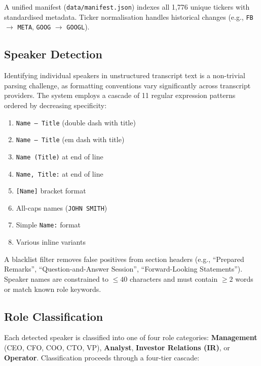 \documentclass[12pt,a4paper]{article}
\begin{document}
A unified manifest (\texttt{data/manifest.json}) indexes all 1,776 unique tickers with standardised metadata. Ticker normalisation handles historical changes (e.g., \texttt{FB} $\to$ \texttt{META}, \texttt{GOOG} $\to$ \texttt{GOOGL}).

\subsection{Speaker Detection}
\label{sec:speaker-detection}

Identifying individual speakers in unstructured transcript text is a non-trivial parsing challenge, as formatting conventions vary significantly across transcript providers. The system employs a cascade of 11 regular expression patterns ordered by decreasing specificity:

\begin{enumerate}[noitemsep]
    \item \texttt{Name -- Title} (double dash with title)
    \item \texttt{Name --- Title} (em dash with title)
    \item \texttt{Name (Title)} at end of line
    \item \texttt{Name, Title:} at end of line
    \item \texttt{[Name]} bracket format
    \item All-caps names (\texttt{JOHN SMITH})
    \item Simple \texttt{Name:} format
    \item Various inline variants
\end{enumerate}

A blacklist filter removes false positives from section headers (e.g., ``Prepared Remarks'', ``Question-and-Answer Session'', ``Forward-Looking Statements''). Speaker names are constrained to $\leq 40$ characters and must contain $\geq 2$ words or match known role keywords.

\subsection{Role Classification}
\label{sec:role-classification}

Each detected speaker is classified into one of four role categories: \textbf{Management} (CEO, CFO, COO, CTO, VP), \textbf{Analyst}, \textbf{Investor Relations (IR)}, or \textbf{Operator}. Classification proceeds through a four-tier cascade:
\end{document}
